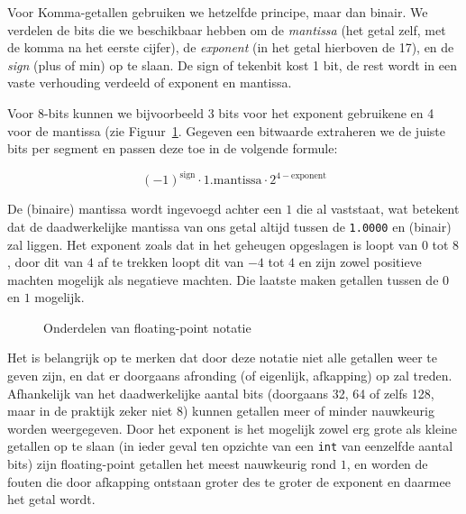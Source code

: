 Voor Komma-getallen gebruiken we hetzelfde principe, maar dan binair. We verdelen de bits die we beschikbaar hebben om de \emph{mantissa} (het getal zelf, met de komma na het eerste cijfer), de \emph{exponent} (in het getal hierboven de 17), en de \emph{sign} (plus of min) op te slaan. De sign of tekenbit kost 1 bit, de rest wordt in een vaste verhouding verdeeld of exponent en mantissa.

Voor 8-bits kunnen we bijvoorbeeld 3 bits voor het exponent gebruikene en 4 voor de mantissa (zie Figuur~\ref{fig:float8}. Gegeven een bitwaarde extraheren we de juiste bits per segment en passen deze toe in de volgende formule:

$$(-1)^{\text{sign}} \cdot 1.\text{mantissa} \cdot 2^{4-\text{exponent}}$$

De (binaire) mantissa wordt ingevoegd achter een $1$ die al vaststaat, wat betekent dat de daadwerkelijke mantissa van ons getal altijd tussen de \texttt{1.0000} en  (binair) zal liggen. Het exponent zoals dat in het geheugen opgeslagen is loopt van $0$ tot $8$, door dit van $4$ af te trekken loopt dit van $-4$ tot $4$ en zijn zowel positieve machten mogelijk als negatieve machten. Die laatste maken getallen tussen de $0$ en $1$ mogelijk.

\begin{figure}[ht]
\centering
{}
\caption{Onderdelen van floating-point notatie}
\label{fig:float8}
\end{figure}

Het is belangrijk op te merken dat door deze notatie niet alle getallen weer te geven zijn, en dat er doorgaans afronding (of eigenlijk, afkapping) op zal treden. Afhankelijk van het daadwerkelijke aantal bits (doorgaans 32, 64 of zelfs 128, maar in de praktijk zeker niet 8) kunnen getallen meer of minder nauwkeurig worden weergegeven. Door het exponent is het mogelijk zowel erg grote als kleine getallen op te slaan (in ieder geval ten opzichte van een \texttt{int} van eenzelfde aantal bits) zijn floating-point getallen het meest nauwkeurig rond $1$, en worden de fouten die door afkapping ontstaan groter des te groter de exponent en daarmee het getal wordt.

